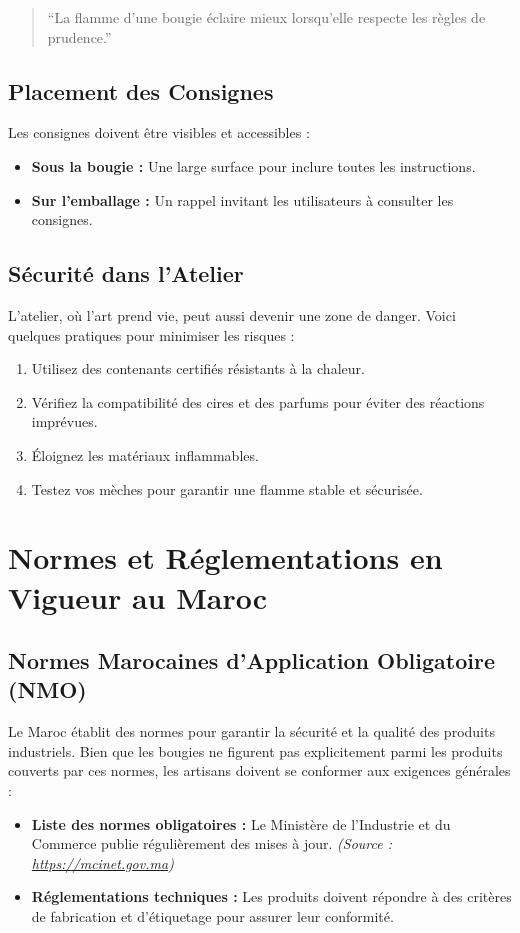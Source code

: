 \documentclass[11pt,fleqn,onecolumn,oneside]{book}
\begin{document}
\begin{quote}
``La flamme d’une bougie éclaire mieux lorsqu’elle respecte les règles de prudence.''
\end{quote}

\subsection*{Placement des Consignes}

Les consignes doivent être visibles et accessibles :
\begin{itemize}
    \item \textbf{Sous la bougie :} Une large surface pour inclure toutes les instructions.
    \item \textbf{Sur l’emballage :} Un rappel invitant les utilisateurs à consulter les consignes.
\end{itemize}

\subsection*{Sécurité dans l’Atelier}

L’atelier, où l’art prend vie, peut aussi devenir une zone de danger. Voici quelques pratiques pour minimiser les risques :
\begin{enumerate}
    \item Utilisez des contenants certifiés résistants à la chaleur.
    \item Vérifiez la compatibilité des cires et des parfums pour éviter des réactions imprévues.
    \item Éloignez les matériaux inflammables.
    \item Testez vos mèches pour garantir une flamme stable et sécurisée.
\end{enumerate}

\section{Normes et Réglementations en Vigueur au Maroc}

\subsection*{Normes Marocaines d'Application Obligatoire (NMO)}

Le Maroc établit des normes pour garantir la sécurité et la qualité des produits industriels. Bien que les bougies ne figurent pas explicitement parmi les produits couverts par ces normes, les artisans doivent se conformer aux exigences générales :
\begin{itemize}
    \item \textbf{Liste des normes obligatoires :} Le Ministère de l’Industrie et du Commerce publie régulièrement des mises à jour. \textit{(Source : \url{https://mcinet.gov.ma})}
    \item \textbf{Réglementations techniques :} Les produits doivent répondre à des critères de fabrication et d’étiquetage pour assurer leur conformité. 
\end{itemize}
\end{document}
